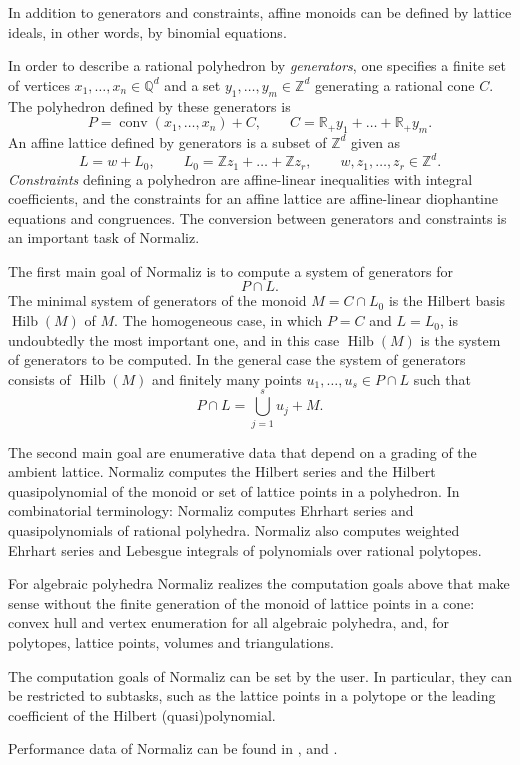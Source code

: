 \documentclass[12pt,a4paper]{scrartcl}
\theoremstyle{definition}
\def\ZZ{{\mathbb Z}}
\def\QQ{{\mathbb Q}}
\def\RR{{\mathbb R}}
\DeclareMathOperator{\conv}{conv}
\DeclareMathOperator{\Hilb}{Hilb}
\begin{document}
In addition to generators and constraints, affine monoids can be defined by lattice ideals, in other words, by binomial equations.

In order to describe a rational polyhedron by \emph{generators}, one specifies a finite set of vertices $x_1,\dots,x_n\in\QQ^d$ and a set $y_1,\dots,y_m\in\ZZ^d$ generating a rational cone $C$. The polyhedron defined by these generators is 
$$
P=\conv(x_1,\dots,x_n)+C,\qquad C=\RR_+y_1+\dots+\RR_+y_m.
$$
An affine lattice defined by generators is a subset of $\ZZ^d$ given as
$$
L=w+L_0,\qquad L_0=\ZZ z_1+\dots+\ZZ z_r, \qquad w,z_1,\dots,z_r\in \ZZ^d.
$$
\emph{Constraints} defining a polyhedron are affine-linear inequalities with integral coefficients, and the constraints for an affine lattice are affine-linear diophantine equations and congruences. The conversion between generators and constraints is an important task of Normaliz.


The first main goal of Normaliz is to compute a system of generators for
$$
P\cap L.
$$
The minimal system of generators of the monoid $M=C\cap L_0$ is the Hilbert basis $\Hilb(M)$ of $M$. The homogeneous case, in which $P=C$ and $L=L_0$, is undoubtedly the most important one, and in this case $\Hilb(M)$ is the system of generators to be computed. In the general case the system of generators consists of $\Hilb(M)$ and finitely many points $u_1,\dots,u_s\in P\cap L$ such that
$$
P\cap L=\bigcup_{j=1}^s u_j+M.
$$

The second main goal are enumerative data that depend on a grading
of the ambient lattice. Normaliz computes the Hilbert series and
the Hilbert quasipolynomial of the monoid or set of lattice points in a polyhedron. In combinatorial terminology: Normaliz computes Ehrhart series and quasipolynomials of rational polyhedra. Normaliz also computes weighted
Ehrhart series and Lebesgue integrals of polynomials over
rational polytopes.

For algebraic polyhedra Normaliz realizes the computation goals above that make sense without the finite generation of the monoid of lattice points in a cone: convex hull and vertex enumeration for all algebraic polyhedra, and, for polytopes, lattice points, volumes and triangulations.

The computation goals of Normaliz can be set by the user. In particular, they can be restricted to subtasks, such as the lattice points in a polytope or the leading coefficient of the Hilbert (quasi)polynomial.

Performance data of Normaliz can be found in \cite{BI2}, \cite{BIS} and \cite{BIS2}.
\end{document}
